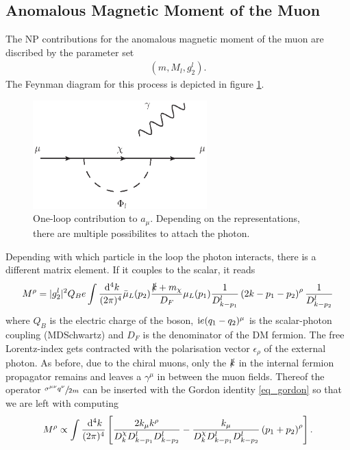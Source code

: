 \subsection{Anomalous Magnetic Moment of the Muon}
The NP contributions for the anomalous magnetic moment of the muon are discribed by the parameter set 
\begin{align}
 \left(m, M_l, g_2^l\right).
\end{align}
The Feynman diagram for this process is depicted in figure \ref{pic_g-2}. 
\begin{figure}[t]
 \includegraphics[width=0.6\textwidth]{../pics/g-2.eps}
 \caption{One-loop contribution to $a_\mu$. Depending on the representations, there are multiple possibilites to attach the photon.}
 \label{pic_g-2}
\end{figure}
Depending with which particle in the loop the photon interacts, there is a different matrix element. If it couples to the scalar, it reads
\begin{align}
 M^\rho = |g_2^l|^2 Q_B e \int \frac{\; \mathrm{d}^4 k}{(2\pi)^4} \bar\mu_L(p_2) \frac{\slashed{k}+m_\chi}{D_F}\mu_L(p_1) \frac{1}{D^l_{k-p_1}}\left(2k-p_1-p_2\right)^\rho\frac{1}{D^l_{k-p_2}}
\end{align}
where $Q_B$ is the electric charge of the boson, $\text{i} e(q_1-q_2)^\mu$ is the scalar-photon coupling (MDSchwartz) and $D_F$ is the denominator of the
DM fermion. The free Lorentz-index gets contracted with
the polarisation vector $\epsilon_\rho$ of the external photon. As before, due to the chiral muons, only the $\slashed{k}$ in the internal fermion
propagator remains and leaves a $\gamma^\mu$ in between the muon fields. Thereof the operator $\sfrac{\sigma^{\mu\nu}q^\nu}{2m}$ can be inserted with the Gordon 
identity \eqref{eq_gordon} so that we are left with computing 
\begin{align}
 M^\rho \propto \int\frac{\; \mathrm{d}^4 k}{(2\pi)^4} \left[ \frac{2k_\mu k^\rho}{D^\chi_kD^l_{k-p_1}D^l_{k-p_2}} - \frac{k_\mu}{D^\chi_kD^l_{k-p_1}D^l_{k-p_2}}\left(p_1 +p_2\right)^\rho \right].
\end{align}

